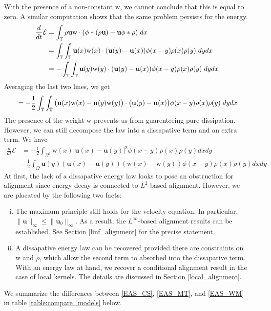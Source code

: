 \documentclass[11pt,letterpaper]{amsart}
\theoremstyle{plain}
\theoremstyle{definition}
\theoremstyle{remark}
\newcommand{\T}{\ensuremath{\mathbb{T}}}   %
\def \cE {\mathcal{E}}
\renewcommand{\leq}{\leqslant}
\def\T{\mathbb{T}}
\def\u{\textbf{u}}
\def \wt {\mathrm{w}}
\begin{document}
With the presence of a non-constant $\wt$, we cannot conclude that this is equal to zero.  A similar computation 
shows that the same problem persists for the energy. 
\begin{align*}
    \frac{d}{dt} \cE 
        &= \int_{\T} \rho \u \wt \cdot (\phi * (\rho \u) - \u \phi * \rho) \hspace{1mm} dx \\
        &= \int_{\T} \int_{\T} \u(x) \wt(x) \cdot (\u(y) - \u(x)) \phi(x-y) \rho(x) \rho(y) \hspace{1mm} dy dx \\
        &= -\int_{\T} \int_{\T} \u(y) \wt(y) \cdot (\u(y) - \u(x)) \phi(x-y) \rho(x) \rho(y) \hspace{1mm} dy dx \\
\end{align*}
Averaging the last two lines, we get 
\begin{align*}
    &= -\frac{1}{2} \int_{\T} \int_{\T} \big( \u(x) \wt(x) - \u(y) \wt(y) \big) \cdot \big(\u(y) - \u(x) \big) \phi(x-y) \rho(x) \rho(y) \hspace{1mm} dy dx \\
\end{align*}
The presence of the weight $\wt$ prevents us from guarenteeing pure dissipation. 
However, we can still decompose the law into a dissapative term and an extra term. 
We have 
\begin{align}
    \label{energy_time_deriv}
    \frac{d}{dt} \cE &= -\frac{1}{2} \int_{\Omega^2} \wt(x) |\u(x)-\u(y)|^2 \phi(x-y) \rho(x) \rho(y) dx dy \\
        &-\frac{1}{2} \int_{\Omega} \u(y) (\u(x) - \u(y)) (\wt(x) - \wt(y)) \phi(x-y) \rho(x) \rho(y) dx dy   \nonumber
\end{align} 
At first, the lack of a dissapative energy law looks to pose an obstruction for alignment since energy decay 
is connected to $L^2$-based alignment.  However, we are placated by the following two facts:
\begin{enumerate} [(i)]
    \item The maximum principle still holds for the velocity equation. 
    In particular, $\|\u\|_{\infty} \leq \|\u_0\|_{\infty}$.  As a result, the $L^{\infty}$-based 
    alignment results can be established.  See Section \ref{linf_alignment} for the precise statement. 
    \item A dissapative energy law can be 
    recovered provided there are constraints on $\wt$ and $\rho$, which allow the second 
    term to absorbed into the dissapative term. 
    With an energy law at hand, we recover a conditional alignment result in the case 
    of local kernels. The details are discussed in Section \ref{local_alignment}.
\end{enumerate}
We summarize the differences between \eqref{EAS_CS}, \eqref{EAS_MT}, and \eqref{EAS_WM} in table \ref{table:compare_models} below.
\end{document}
